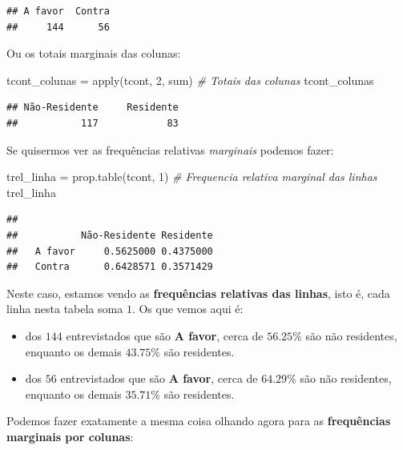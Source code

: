 \documentclass[
]{book}
\newenvironment{Shaded}{\begin{snugshade}}{\end{snugshade}}
\newcommand{\CommentTok}[1]{\textcolor[rgb]{0.56,0.35,0.01}{\textit{#1}}}
\newcommand{\DecValTok}[1]{\textcolor[rgb]{0.00,0.00,0.81}{#1}}
\newcommand{\FunctionTok}[1]{\textcolor[rgb]{0.00,0.00,0.00}{#1}}
\newcommand{\NormalTok}[1]{#1}
\newcommand{\OtherTok}[1]{\textcolor[rgb]{0.56,0.35,0.01}{#1}}
\begin{document}
\begin{verbatim}
## A favor  Contra 
##     144      56
\end{verbatim}

Ou os totais marginais das colunas:

\begin{Shaded}
\begin{Highlighting}[]
\NormalTok{tcont\_colunas }\OtherTok{=} \FunctionTok{apply}\NormalTok{(tcont, }\DecValTok{2}\NormalTok{, sum) }\CommentTok{\# Totais das colunas}
\NormalTok{tcont\_colunas}
\end{Highlighting}
\end{Shaded}

\begin{verbatim}
## Não-Residente     Residente 
##           117            83
\end{verbatim}

Se quisermos ver as frequências relativas \emph{marginais} podemos fazer:

\begin{Shaded}
\begin{Highlighting}[]
\NormalTok{trel\_linha }\OtherTok{=} \FunctionTok{prop.table}\NormalTok{(tcont, }\DecValTok{1}\NormalTok{) }\CommentTok{\# Frequencia relativa marginal das linhas}
\NormalTok{trel\_linha}
\end{Highlighting}
\end{Shaded}

\begin{verbatim}
##          
##           Não-Residente Residente
##   A favor     0.5625000 0.4375000
##   Contra      0.6428571 0.3571429
\end{verbatim}

Neste caso, estamos vendo as \textbf{frequências relativas das linhas}, isto é, cada linha nesta tabela soma \(1\). Os que vemos aqui é:

\begin{itemize}
\item
  dos \(144\) entrevistados que são \textbf{A favor}, cerca de \(56.25\%\) são não residentes, enquanto os demais \(43.75\%\) são residentes.
\item
  dos \(56\) entrevistados que são \textbf{A favor}, cerca de \(64.29\%\) são não residentes, enquanto os demais \(35.71\%\) são residentes.
\end{itemize}

Podemos fazer exatamente a mesma coisa olhando agora para as \textbf{frequências marginais por colunas}:
\end{document}
